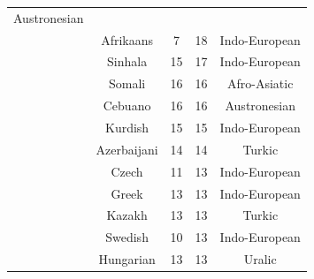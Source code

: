 {\begin{tabular}{|c|c|c|c|c|}
Austronesian \\
	\thetablecount\stepcounter{tablecount} &

Afrikaans &
	

7 &
	

18 &
	

Indo-European \\
	\thetablecount\stepcounter{tablecount} &

Sinhala &
	

15 &
	

17 &
	

Indo-European \\
	\thetablecount\stepcounter{tablecount} &

Somali &
	

16 &
	

16 &
	

Afro-Asiatic \\

	\thetablecount\stepcounter{tablecount} &
Cebuano &
	

16 &
	

16 &
	

Austronesian \\
	\thetablecount\stepcounter{tablecount} &

Kurdish &
	

15 &
	

15 &
	

Indo-European \\

	\thetablecount\stepcounter{tablecount} &
Azerbaijani &
	

14 &
	

14 &
	

Turkic \\

	\thetablecount\stepcounter{tablecount} &
Czech &
	

11 &
	

13 &
	

Indo-European \\
	\thetablecount\stepcounter{tablecount} &

Greek &
	

13 &
	

13 &
	

Indo-European \\
	\thetablecount\stepcounter{tablecount} &

Kazakh &
	

13 &
	

13 &
	

Turkic \\
	\thetablecount\stepcounter{tablecount} &

Swedish &
	

10 &
	

13 &
	

Indo-European \\
	\thetablecount\stepcounter{tablecount}& 

Hungarian &
	

13 &
	

13 &
	

Uralic \\

\end{tabular}
}

